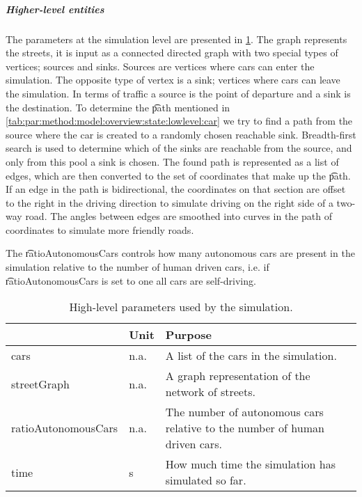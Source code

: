 \subparagraph{Higher-level entities}
The parameters at the simulation level are presented in \cref{tab:par:method:model:overview:state:highlevel:sim}.
The graph represents the streets, it is input as a connected directed graph with two special types of vertices; sources and sinks. Sources are vertices where cars can enter the simulation. The opposite type of vertex is a sink; vertices where cars can leave the simulation. In terms of traffic a source is the point of departure and a sink is the destination. To determine the \t{path} mentioned in \cref{tab:par:method:model:overview:state:lowlevel:car} we try to find a path from the source where the car is created to a randomly chosen reachable sink. Breadth-first search is used to determine which of the sinks are reachable from the source, and only from this pool a sink is chosen. The found path is represented as a list of edges, which are then converted to the set of coordinates that make up the \t{path}. If an edge in the path is bidirectional, the coordinates on that section are offset to the right in the driving direction to simulate driving on the right side of a two-way road. The angles between edges are smoothed into curves in the path of coordinates to simulate more friendly roads.

The \t{ratioAutonomousCars} controls how many autonomous cars are present in the simulation relative to the number of human driven cars, i.e. if \t{ratioAutonomousCars} is set to one all cars are self-driving.

\begin{table}
	\centering
	\begin{tabularx}{\textwidth}{>{\ttfamily}llX}
		\toprule
		\normalfont{Parameter}	&Unit & Purpose \\ 
		\midrule
		cars 					
			& n.a.
			& A list of the cars in the simulation. \\ 
		streetGraph		 		
			& n.a.
			& A graph representation of the network of streets. \\ 
		ratioAutonomousCars		 		
			& n.a.
			& The number of autonomous cars relative to the number of human driven cars.\\
		time 
			& \si{\second}
			& How much time the simulation has simulated so far.\\
		\bottomrule
	\end{tabularx}
	\caption{High-level parameters used by the simulation.}
	\label{tab:par:method:model:overview:state:highlevel:sim}
\end{table}

